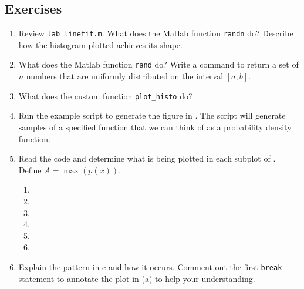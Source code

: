 \documentclass[11pt,titlepage,fleqn]{article}
\begin{document}




\pagebreak
\subsection*{Exercises}

\begin{enumerate}
\item Review \verb+lab_linefit.m+. What does the Matlab function \verb+randn+ do? Describe how the histogram plotted achieves its shape.

\vertgap

\item What does the Matlab function \verb+rand+ do? Write a command to return a set of $n$ numbers that are uniformly distributed on the interval $[a,b]$.

\vertgap

\item What does the custom function \verb+plot_histo+ do?

\vertgap

\item Run the example script to generate the figure in . The script will generate samples of a specified function that we can think of as a probability density function.

\item Read the code and determine what is being plotted in each subplot of . \\
Define $A = \max(p(x))$.
%
\begin{spacing}{2.0}
\begin{enumerate}
\item 
\item 
\item 
\item 
\item 
\item 
\end{enumerate}
\end{spacing}

\item Explain the pattern in c and how it occurs. Comment out the first \verb+break+ statement to annotate the plot in (a) to help your understanding.


\end{enumerate}
\end{document}
